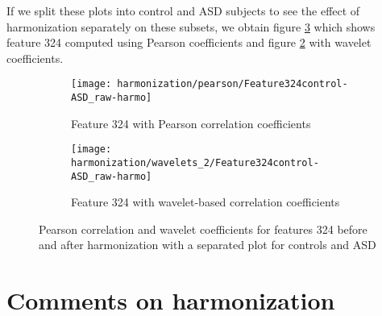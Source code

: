 \documentclass[11pt]{report}
\begin{document}
 If we split these plots into control and ASD subjects to see the effect of harmonization separately on these subsets, we obtain figure \ref{fig:features_control-ASD_raw-harmo} which shows feature 324 computed using Pearson coefficients and figure \ref{fig:feature324-control-ASD_w} with wavelet coefficients.

 \begin{figure}
 \centering
 \begin{subfigure}[b]{1.\textwidth}
    \texttt{[image: harmonization/pearson/Feature324control-ASD\_raw-harmo]}
    \caption{Feature 324 with Pearson correlation coefficients}
    \label{fig:feature324-control-ASD}
 \end{subfigure}
 \begin{subfigure}[b]{1.\textwidth}
    \texttt{[image: harmonization/wavelets\_2/Feature324control-ASD\_raw-harmo]}
    \caption{Feature 324 with wavelet-based correlation coefficients}
    \label{fig:feature324-control-ASD_w}
 \end{subfigure}
 \caption{Pearson correlation and wavelet coefficients for features 324 before and after harmonization with a separated plot for controls and ASD}
 \label{fig:features_control-ASD_raw-harmo}
 \end{figure}




\section{Comments on harmonization}

\end{document}
